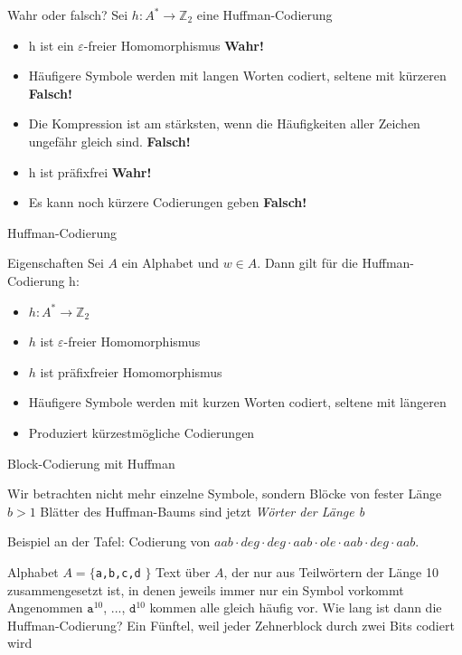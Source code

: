 \documentclass[handout]{beamer}
\begin{document}
\begin{frame}{Wahr oder falsch?}
Sei $h: A^* \rightarrow \mathbb{Z}_2$ eine Huffman-Codierung
\begin{itemize}
\item h ist ein $\varepsilon$-freier Homomorphismus \pause \textbf{Wahr!}\pause
\item Häufigere Symbole werden mit langen Worten codiert, seltene mit kürzeren \pause \textbf{Falsch!}\pause
\item Die Kompression ist am stärksten, wenn die Häufigkeiten aller Zeichen ungefähr gleich sind. \pause \textbf{Falsch!} \pause
\item h ist präfixfrei \pause \textbf{Wahr!} \pause
\item Es kann noch kürzere Codierungen geben \pause \textbf{Falsch!}
\end{itemize}
\end{frame}


\begin{frame}{Huffman-Codierung}
\begin{block}{Eigenschaften}
Sei $A$ ein Alphabet und $w \in A$. Dann gilt für die Huffman-Codierung h:
\begin{itemize}
\item $h: A^* \rightarrow \mathbb{Z}_2$
\item $h$ ist $\varepsilon$-freier Homomorphismus
\item $h$ ist präfixfreier Homomorphismus
\item Häufigere Symbole werden mit kurzen Worten codiert, seltene mit längeren
\item Produziert kürzestmögliche Codierungen
\end{itemize}
\end{block}
\end{frame}

\begin{frame}{Block-Codierung mit Huffman}
\begin{itemize}
\pitem Wir betrachten nicht mehr einzelne Symbole, sondern Blöcke von fester Länge $b > 1$
\pitem Blätter des Huffman-Baums sind jetzt \textit{Wörter der Länge b}
\end{itemize}

\vspace{.5cm}

Beispiel an der Tafel: Codierung von $aab\cdot deg \cdot deg \cdot aab \cdot ole \cdot aab \cdot deg \cdot aab$.\p

\vspace{.5cm}

\p
\begin{itemize}
\pitem Alphabet $A =\{$\texttt{a,b,c,d} $\}$
\pitem Text über $A$, der nur aus Teilwörtern der Länge 10 zusammengesetzt ist, in denen jeweils immer nur ein Symbol vorkommt
\pitem Angenommen $\texttt{a}^{10}$, ..., $\texttt{d}^{10}$ kommen alle gleich häufig vor. Wie lang ist dann die Huffman-Codierung? \pause
\pitem[$\rightarrow$] Ein Fünftel, weil jeder Zehnerblock durch zwei Bits codiert wird
\end{itemize}

\end{frame}
\end{document}
